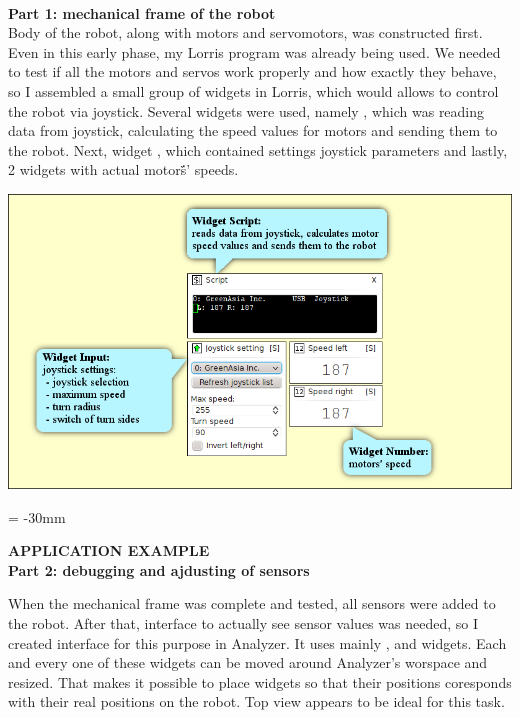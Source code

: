 \documentclass[17pt]{extreport}
\newcommand{\B}{\textbf} %
\begin{document}
\\{\large \B{Part 1: mechanical frame of the robot}}\\
Body of the robot, along with motors and servomotors, was constructed first. Even in this early phase, my Lorris program was already being used. We needed to test if all the motors and servos work properly and how exactly they behave, so I assembled a small group of widgets in Lorris, which would allows to control the robot via joystick. Several widgets were used, namely , which was reading data from joystick, calculating the speed values for motors and sending them to the robot. Next, widget , which contained settings joystick parameters and lastly, 2 widgets  with actual motors̈́' speeds.
\begin{center}
\includegraphics{img/joystick2.png}
\end{center}

\newpage
\enlargethispage{100mm} %
\voffset = -30mm %
\begin{center}
    \Large \B{APPLICATION EXAMPLE \\Part 2: debugging and ajdusting of sensors}
\end{center}
\vspace{5mm}
When the mechanical frame was complete and tested, all sensors were added to the robot. After that, interface to actually see sensor values was needed, so I created interface for this purpose in Analyzer. It uses mainly ,   and  widgets. Each and every one of these widgets can be moved around Analyzer's worspace and resized. That makes it possible to place widgets so that their positions coresponds with their real positions on the robot. Top view appears to be ideal for this task.
\end{document}
